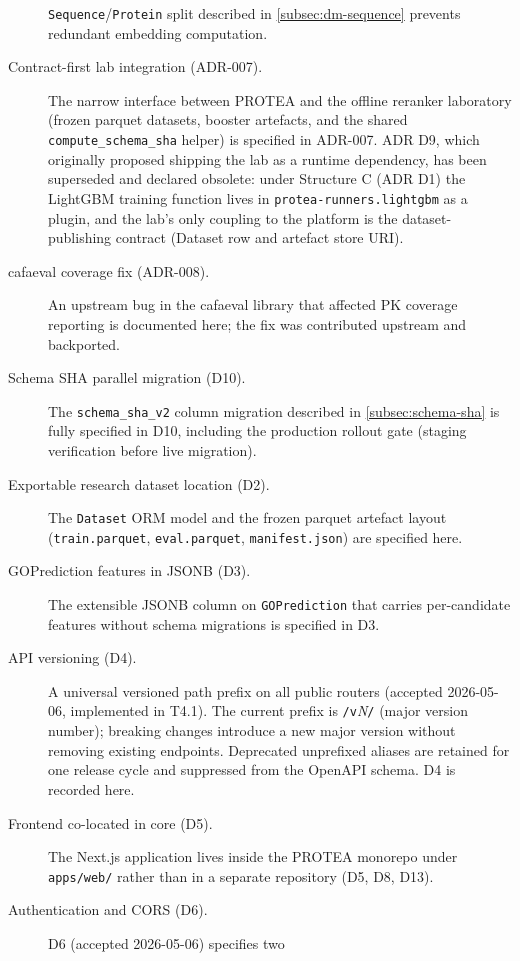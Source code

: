 \begin{description}
    \texttt{Sequence}/\texttt{Protein} split described in
    \cref{subsec:dm-sequence} prevents redundant embedding computation.
  \item[Contract-first lab integration (ADR-007).] The narrow interface
    between PROTEA and the offline reranker laboratory (frozen parquet datasets,
    booster artefacts, and the shared \texttt{compute\_schema\_sha} helper) is
    specified in ADR-007. ADR D9, which originally proposed shipping the lab as
    a runtime dependency, has been superseded and declared obsolete: under
    Structure C (ADR D1) the LightGBM training function lives in
    \texttt{protea-runners.lightgbm} as a plugin, and the lab's only coupling
    to the platform is the dataset-publishing contract (Dataset row and artefact
    store URI).
  \item[cafaeval coverage fix (ADR-008).] An upstream bug in the cafaeval
    library that affected PK coverage reporting is documented here; the fix
    was contributed upstream and backported.
  \item[Schema SHA parallel migration (D10).] The \texttt{schema\_sha\_v2}
    column migration described in \cref{subsec:schema-sha} is fully specified
    in D10, including the production rollout gate (staging verification before
    live migration).
  \item[Exportable research dataset location (D2).] The \texttt{Dataset} ORM
    model and the frozen parquet artefact layout (\texttt{train.parquet},
    \texttt{eval.parquet}, \texttt{manifest.json}) are specified here.
  \item[GOPrediction features in JSONB (D3).] The extensible JSONB column on
    \texttt{GOPrediction} that carries per-candidate features without
    schema migrations is specified in D3.
  \item[API versioning (D4).] A universal versioned path prefix on all public
    routers (accepted 2026-05-06, implemented in T4.1). The current prefix is
    \texttt{/v}\emph{N}\texttt{/} (major version number); breaking changes introduce
    a new major version without removing existing endpoints. Deprecated unprefixed
    aliases are retained for one release cycle and suppressed from the OpenAPI
    schema. D4 is recorded here.
  \item[Frontend co-located in core (D5).] The Next.js application lives
    inside the PROTEA monorepo under \texttt{apps/web/} rather than in a
    separate repository (D5, D8, D13).
  \item[Authentication and CORS (D6).] D6 (accepted 2026-05-06) specifies two

\end{description}
